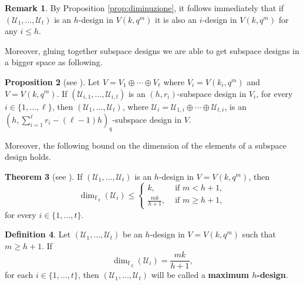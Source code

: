 \documentclass[11pt]{amsart}
\theoremstyle{definition}
\newtheorem{theorem}{Theorem}[section]
\newtheorem{corollary}[theorem]{Corollary}
\newtheorem{definition}[theorem]{Definition}
\newtheorem{proposition}[theorem]{Proposition}
\newtheorem{remark}[theorem]{Remark}
\newcommand{\U}{{\mathcal{U}}}
\newcommand{\fq}{{\mathbb F}_{q}}
\begin{document}
\begin{remark} \label{rk:hdesimpliesh'}
By Proposition \ref{prop:diminuzione}, it follows immediately that if $(\U_1,\ldots,\U_t)$ is an $h$-design in $V(k,q^m)$ it is also an $i$-design in $V(k,q^m)$ for any $i \leq h$.
\end{remark}

Moreover, gluing together subspace designs we are able to get subspace designs in a bigger space as following.

\begin{proposition} [see \textnormal{\cite[Corollary 4.6]{santonastaso2022subspace}}]
\label{cor:directsum}
Let $V=V_1 \oplus \cdots \oplus V_\ell$ where $V_i=V(k_i,q^m)$ and $V=V(k,q^m)$. If $(\U_{i,1},\ldots,\U_{i,t})$ is an $(h,r_i)$-subspace design in $V_i$, for every $i\in \{1,\ldots,\ell\}$, then $(\U_1,\ldots,\U_t)$, where $\U_i=\U_{1,i} \oplus \cdots \oplus \U_{t,i}$, is an $(h,\sum_{i=1}^{\ell} r_i-(\ell-1)h)_q$-subspace design in $V$. 
\end{proposition}

Moreover, the following bound on the dimension of the elements of a subspace design holds.

\begin{theorem} [see \textnormal{\cite[Theorem 4.8]{santonastaso2022subspace}}] %
If $(\U_1,\ldots,\U_t)$ is an $h$-design in $V=V(k,q^m)$, then
\[ \dim_{\fq}(\U_i)\leq \begin{cases}
k, & \mbox{ if } m < h+1,\\
\frac{mk}{h+1}, & \mbox{ if } m \geq h+1,
\end{cases} \]
for every $i \in \{1,\ldots,t\}$.
\end{theorem}

\begin{definition} \cite[Definition 4.12]{santonastaso2022subspace}
Let $(\U_1,\ldots,\U_t)$ be an $h$-design in $V=V(k,q^m)$ such that $m\geq h+1$. If
\begin{equation*} 
 \dim_{\fq}(\U_i)= \frac{mk}{h+1},
 \end{equation*}
 for each $i \in \{1,\ldots,t\} $, then $(\U_1,\ldots,\U_t)$ will be called a \textbf{maximum $h$-design}.
\end{definition}


\end{document}
